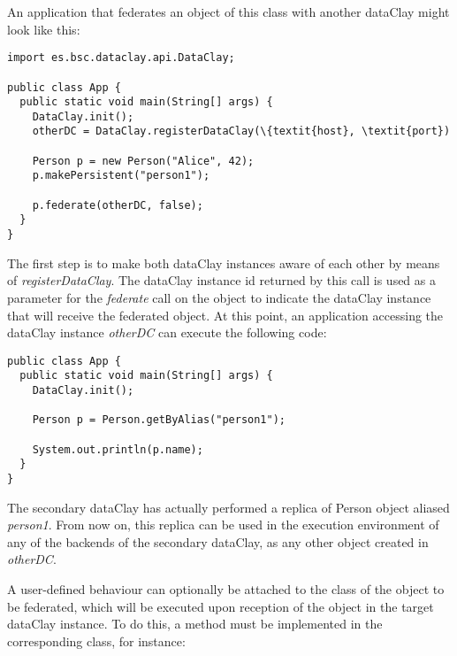 An application that federates an object of this class with another dataClay might look like this:

\begin{tBox}
\begin{lstlisting}
import es.bsc.dataclay.api.DataClay;

public class App {
  public static void main(String[] args) {
    DataClay.init();
    otherDC = DataClay.registerDataClay(\{textit{host}, \textit{port})
    
    Person p = new Person("Alice", 42);
    p.makePersistent("person1");
    
    p.federate(otherDC, false); 
  }
}
\end{lstlisting}
\end{tBox}

The first step is to make both dataClay instances aware of each other by means of \textit{registerDataClay}. The dataClay instance id returned by this call is used as a parameter for the \textit{federate} call on the object to indicate the dataClay instance that will receive the federated object. 
At this point, an application accessing the dataClay instance \textit{otherDC} can execute the following code:

\begin{tBox}
\begin{lstlisting}
public class App {
  public static void main(String[] args) {
    DataClay.init();
    
    Person p = Person.getByAlias("person1");
    
    System.out.println(p.name);
  }
}
\end{lstlisting}
\end{tBox}

The secondary dataClay has actually performed a replica of Person object aliased \textit{person1}. From now on, this 
replica can be used in the execution environment of any of the backends of the secondary dataClay, as any other object created in \textit{otherDC}.

A user-defined behaviour can optionally be attached to the class of the object to be federated, which will be executed upon reception of the object in the target dataClay instance. To do this, a method  must be implemented in the corresponding class, for instance:

\begin{tBox}
\begin{lslisting}
public class Person {
  String name;
  int age;
  public Person(String name, int age) {
    this.name = name;
    this.age = age;
  public whenFederated() {
    PersonList pl = PersonList.getByAlias("persons"); 
    pl.add(this);
  }
}
\end{lstlisting}
\end{tBox}

